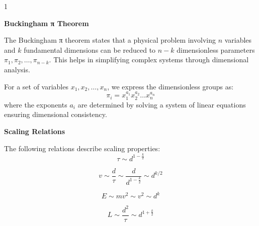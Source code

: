 \documentclass[1pt]{article}
\begin{document}
\begin{multicols}{1} %

\textbf{Buckingham π Theorem}

The Buckingham π theorem states that a physical problem involving $n$ variables and $k$ fundamental dimensions can be reduced to $n-k$ dimensionless parameters $\pi_1, \pi_2, \dots, \pi_{n-k}$. This helps in simplifying complex systems through dimensional analysis.

For a set of variables $x_1, x_2, \dots, x_n$, we express the dimensionless groups as:
\begin{equation*}
    \pi_i = x_1^{a_1} x_2^{a_2} \dots x_n^{a_n}
\end{equation*}
where the exponents $a_i$ are determined by solving a system of linear equations ensuring dimensional consistency.

\textbf{Scaling Relations}

The following relations describe scaling properties:
\begin{equation*}
    \tau \sim d^{1 - \frac{k}{2}}
\end{equation*}

\begin{equation*}
    v \sim \frac{d}{\tau} \sim \frac{d}{d^{1 - \frac{k}{2}}} \sim d^{k/2}
\end{equation*}

\begin{equation*}
    E \sim m v^2 \sim v^2 \sim d^k
\end{equation*}

\begin{equation*}
    L \sim \frac{d^2}{\tau} \sim d^{1 + \frac{k}{2}}
\end{equation*}

\end{multicols}
\end{document}
